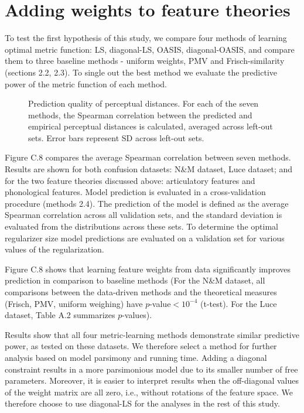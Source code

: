 \chapter{Adding weights to feature theories}
To test the first hypothesis of this study, we compare four methods of learning optimal metric function: LS, diagonal-LS, OASIS, diagonal-OASIS, and compare them to three baseline methods - uniform weights, PMV and Frisch-similarity (sections 2.2, 2.3). To single out the best method we evaluate the predictive power of the metric function of each method.

\begin{figure}[t]
\vspace{.3in}
\caption{Prediction quality of perceptual distances. For each of the seven methods, the Spearman correlation between the predicted and empirical perceptual distances is calculated, averaged across left-out sets. Error bars represent SD across left-out sets.} 
\end{figure}

Figure C.8 compares the average Spearman correlation between seven methods. Results are shown for both confusion datasets: N\&M dataset, Luce dataset; and for the two feature theories discussed above: articulatory features and phonological features. Model prediction is evaluated in a cross-validation procedure (methods 2.4). The prediction of the model is defined as the average Spearman correlation across all validation sets, and the standard deviation is evaluated from the distributions across these sets. To determine the optimal regularizer size model predictions are evaluated on a validation set for various values of the regularization.

Figure C.8 shows that learning feature weights from data significantly improves prediction in comparison to baseline methods (For the N\&M dataset, all comparisons between the data-driven methods and the theoretical measures (Frisch, PMV, uniform weighing) have $p$-value$<10^{-4}$ (t-test). For the Luce dataset, Table A.2 summarizes $p$-values).

Results show that all four metric-learning methods demonstrate similar predictive power, as tested on these datasets. We therefore select a method for further analysis based on model parsimony and running time. Adding a diagonal constraint results in a more parsimonious model due to its smaller number of free parameters. Moreover, it is easier to interpret results when the off-diagonal values of the weight matrix are all zero, i.e., without rotations of the feature space. We therefore choose to use diagonal-LS for the analyses in the rest of this study.